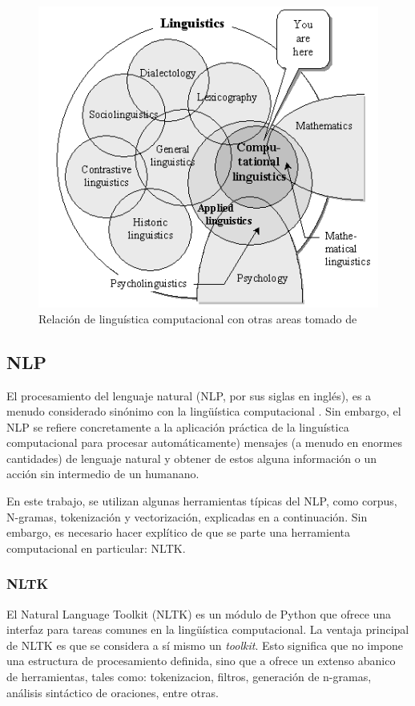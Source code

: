 \documentclass[12pt,letterpaper,twoside]{article}
\begin{document}
\begin{figure}[htbp]
\centering
\includegraphics[width=.9\linewidth]{./assets/mapa_linguistica.png}
\caption{\label{fig:org6e805a1}Relación de linguística computacional con otras areas tomado de \cite{gelbukh2004}}
\end{figure}


\subsection{NLP}
\label{sec:org906c13f}
El procesamiento del lenguaje natural (NLP, por sus siglas en
inglés), es a menudo considerado sinónimo con la lingüística
computacional \cite{gelbukh2004}.  Sin embargo, el NLP se refiere
concretamente a la aplicación práctica de la linguística
computacional para procesar automáticamente) mensajes (a menudo en
enormes cantidades) de lenguaje natural y obtener de estos alguna
información o un acción sin intermedio de un humanano.

En este trabajo, se utilizan algunas herramientas típicas del
NLP, como corpus, N-gramas, tokenización y vectorización, explicadas
en a continuación. Sin embargo, es necesario hacer explítico de
que se parte una herramienta computacional en particular: NLTK.

\subsubsection{NLTK}
\label{sec:org004cd0a}
El Natural Language Toolkit (NLTK) es un módulo de Python que ofrece
una interfaz para tareas comunes en la lingüística computacional. La
ventaja principal de NLTK es que se considera a sí mismo un
\emph{toolkit}. Esto significa que no impone una estructura de
procesamiento definida, sino que a ofrece un extenso abanico de
herramientas, tales como: tokenizacion, filtros, generación de
n-gramas, análisis sintáctico de oraciones, entre otras.
\end{document}

